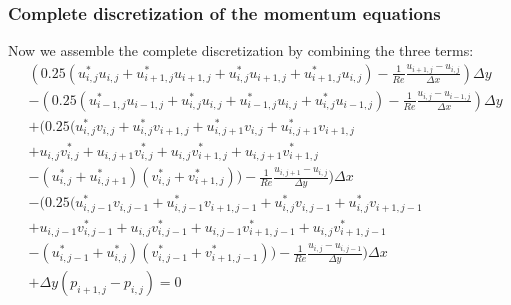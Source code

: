 \documentclass{article}
\begin{document}
\subsubsection*{Complete discretization of the momentum equations}
Now we assemble the complete discretization by combining the three terms:
\begin{equation}
  \begin{aligned}
    & (0.25 (u^*_{i,j} u_{i,j} + u^*_{i+1,j} u_{i+1,j} + u^*_{i,j} u_{i+1,j} + u^*_{i+1,j} u_{i,j}) - \frac{1}{Re} \frac{u_{i+1,j} - u_{i,j}}{\Delta x}) \Delta y  \\
    & - (0.25 (u^*_{i-1,j} u_{i-1,j} + u^*_{i,j} u_{i,j} + u^*_{i-1,j} u_{i,j} + u^*_{i,j} u_{i-1,j}) - \frac{1}{Re} \frac{u_{i,j} - u_{i-1,j}}{\Delta x}) \Delta y \\
    & + (0.25 (u^*_{i,j}v_{i,j} + u^*_{i,j}v_{i+1,j} + u^*_{i,j+1}v_{i,j} + u^*_{i,j+1}v_{i+1,j} \\
    & + u_{i,j}v^*_{i,j} + u_{i,j+1}v^*_{i,j} + u_{i,j}v^*_{i+1,j} + u_{i,j+1}v^*_{i+1,j} \\
    & - (u^*_{i,j} + u^*_{i,j+1}) (v^*_{i,j} + v^*_{i+1,j})) - \frac{1}{Re} \frac{u_{i,j+1} - u_{i,j}}{\Delta y}) \Delta x \\
    & - (0.25 (u^*_{i,j-1}v_{i,j-1} + u^*_{i,j-1}v_{i+1,j-1} + u^*_{i,j}v_{i,j-1} + u^*_{i,j}v_{i+1,j-1} \\
    & + u_{i,j-1}v^*_{i,j-1} + u_{i,j}v^*_{i,j-1} + u_{i,j-1}v^*_{i+1,j-1} + u_{i,j}v^*_{i+1,j-1} \\
    & - (u^*_{i,j-1} + u^*_{i,j}) (v^*_{i,j-1} + v^*_{i+1,j-1})) - \frac{1}{Re} \frac{u_{i,j} - u_{i,j-1}}{\Delta y}) \Delta x \\
    & + \Delta y (p_{i+1,j} - p_{i,j}) = 0
  \end{aligned}
\end{equation}
\end{document}
